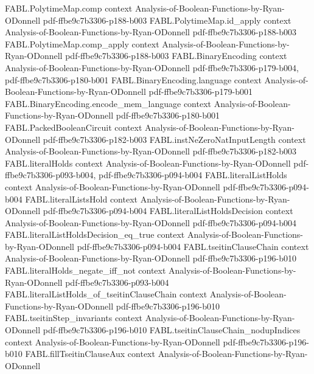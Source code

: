 \begin{theorem}
\proofstep
  {FABL.PolytimeMap.comp}
  {context}
  {Analysis-of-Boolean-Functions-by-Ryan-ODonnell}
  {pdf-ffbe9c7b3306-p188-b003}
\proofstep
  {FABL.PolytimeMap.id_apply}
  {context}
  {Analysis-of-Boolean-Functions-by-Ryan-ODonnell}
  {pdf-ffbe9c7b3306-p188-b003}
\proofstep
  {FABL.PolytimeMap.comp_apply}
  {context}
  {Analysis-of-Boolean-Functions-by-Ryan-ODonnell}
  {pdf-ffbe9c7b3306-p188-b003}
\proofstep
  {FABL.BinaryEncoding}
  {context}
  {Analysis-of-Boolean-Functions-by-Ryan-ODonnell}
  {pdf-ffbe9c7b3306-p179-b004,
    pdf-ffbe9c7b3306-p180-b001}
\proofstep
  {FABL.BinaryEncoding.language}
  {context}
  {Analysis-of-Boolean-Functions-by-Ryan-ODonnell}
  {pdf-ffbe9c7b3306-p179-b001}
\proofstep
  {FABL.BinaryEncoding.encode_mem_language}
  {context}
  {Analysis-of-Boolean-Functions-by-Ryan-ODonnell}
  {pdf-ffbe9c7b3306-p180-b001}
\proofstep
  {FABL.PackedBooleanCircuit}
  {context}
  {Analysis-of-Boolean-Functions-by-Ryan-ODonnell}
  {pdf-ffbe9c7b3306-p182-b003}
\proofstep
  {FABL.instNeZeroNatInputLength}
  {context}
  {Analysis-of-Boolean-Functions-by-Ryan-ODonnell}
  {pdf-ffbe9c7b3306-p182-b003}
\proofstep
  {FABL.literalHolds}
  {context}
  {Analysis-of-Boolean-Functions-by-Ryan-ODonnell}
  {pdf-ffbe9c7b3306-p093-b004,
    pdf-ffbe9c7b3306-p094-b004}
\proofstep
  {FABL.literalListHolds}
  {context}
  {Analysis-of-Boolean-Functions-by-Ryan-ODonnell}
  {pdf-ffbe9c7b3306-p094-b004}
\proofstep
  {FABL.literalListsHold}
  {context}
  {Analysis-of-Boolean-Functions-by-Ryan-ODonnell}
  {pdf-ffbe9c7b3306-p094-b004}
\proofstep
  {FABL.literalListHoldsDecision}
  {context}
  {Analysis-of-Boolean-Functions-by-Ryan-ODonnell}
  {pdf-ffbe9c7b3306-p094-b004}
\proofstep
  {FABL.literalListHoldsDecision_eq_true}
  {context}
  {Analysis-of-Boolean-Functions-by-Ryan-ODonnell}
  {pdf-ffbe9c7b3306-p094-b004}
\proofstep
  {FABL.tseitinClauseChain}
  {context}
  {Analysis-of-Boolean-Functions-by-Ryan-ODonnell}
  {pdf-ffbe9c7b3306-p196-b010}
\proofstep
  {FABL.literalHolds_negate_iff_not}
  {context}
  {Analysis-of-Boolean-Functions-by-Ryan-ODonnell}
  {pdf-ffbe9c7b3306-p093-b004}
\proofstep
  {FABL.literalListHolds_of_tseitinClauseChain}
  {context}
  {Analysis-of-Boolean-Functions-by-Ryan-ODonnell}
  {pdf-ffbe9c7b3306-p196-b010}
\proofstep
  {FABL.tseitinStep_invariants}
  {context}
  {Analysis-of-Boolean-Functions-by-Ryan-ODonnell}
  {pdf-ffbe9c7b3306-p196-b010}
\proofstep
  {FABL.tseitinClauseChain_nodupIndices}
  {context}
  {Analysis-of-Boolean-Functions-by-Ryan-ODonnell}
  {pdf-ffbe9c7b3306-p196-b010}
\proofstep
  {FABL.fillTseitinClauseAux}
  {context}
  {Analysis-of-Boolean-Functions-by-Ryan-ODonnell}

\end{theorem}
